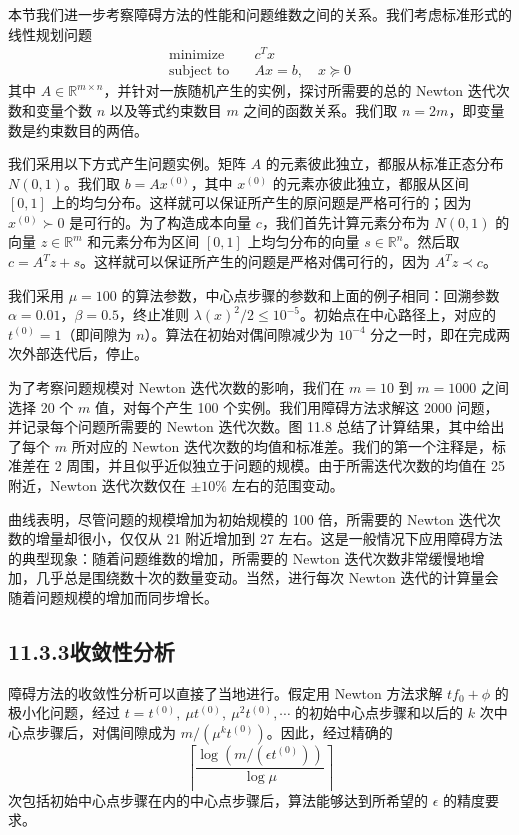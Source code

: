 \documentclass[UTF8,12pt,a4paper,fontset=fandol]{ctexart}
\begin{document}
本节我们进一步考察障碍方法的性能和问题维数之间的关系。我们考虑标准形式的线性规划问题
\[
\begin{aligned}
\text{minimize}\quad & c^Tx\\
\text{subject to}\quad & Ax=b,\quad x\succeq 0
\end{aligned}
\]
其中 $A\in\mathbb{R}^{m\times n}$，并针对一族随机产生的实例，探讨所需要的总的 Newton 迭代次数和变量个数 $n$ 以及等式约束数目 $m$ 之间的函数关系。我们取 $n=2m$，即变量数是约束数目的两倍。

我们采用以下方式产生问题实例。矩阵 $A$ 的元素彼此独立，都服从标准正态分布 $N(0,1)$。我们取 $b=Ax^{(0)}$，其中 $x^{(0)}$ 的元素亦彼此独立，都服从区间 $[0,1]$ 上的均匀分布。这样就可以保证所产生的原问题是严格可行的；因为 $x^{(0)}\succ 0$ 是可行的。为了构造成本向量 $c$，我们首先计算元素分布为 $N(0,1)$ 的向量 $z\in\mathbb{R}^m$ 和元素分布为区间 $[0,1]$ 上均匀分布的向量 $s\in\mathbb{R}^n$。然后取 $c=A^Tz+s$。这样就可以保证所产生的问题是严格对偶可行的，因为 $A^Tz\prec c$。

我们采用 $\mu=100$ 的算法参数，中心点步骤的参数和上面的例子相同：回溯参数 $\alpha=0.01$，$\beta=0.5$，终止准则 $\lambda(x)^2/2\leq 10^{-5}$。初始点在中心路径上，对应的 $t^{(0)}=1$（即间隙为 $n$）。算法在初始对偶间隙减少为 $10^{-4}$ 分之一时，即在完成两次外部迭代后，停止。

为了考察问题规模对 Newton 迭代次数的影响，我们在 $m=10$ 到 $m=1000$ 之间选择 20 个 $m$ 值，对每个产生 100 个实例。我们用障碍方法求解这 2000 问题，并记录每个问题所需要的 Newton 迭代次数。图 11.8 总结了计算结果，其中给出了每个 $m$ 所对应的 Newton 迭代次数的均值和标准差。我们的第一个注释是，标准差在 2 周围，并且似乎近似独立于问题的规模。由于所需迭代次数的均值在 25 附近，Newton 迭代次数仅在 $\pm 10\%$ 左右的范围变动。

曲线表明，尽管问题的规模增加为初始规模的 100 倍，所需要的 Newton 迭代次数的增量却很小，仅仅从 21 附近增加到 27 左右。这是一般情况下应用障碍方法的典型现象：随着问题维数的增加，所需要的 Newton 迭代次数非常缓慢地增加，几乎总是围绕数十次的数量变动。当然，进行每次 Newton 迭代的计算量会随着问题规模的增加而同步增长。

\subsection*{11.3.3\quad 收敛性分析}

障碍方法的收敛性分析可以直接了当地进行。假定用 Newton 方法求解 $tf_0+\phi$ 的极小化问题，经过 $t=t^{(0)},\ \mu t^{(0)},\ \mu^2t^{(0)},\cdots$ 的初始中心点步骤和以后的 $k$ 次中心点步骤后，对偶间隙成为 $m/(\mu^k t^{(0)})$。因此，经过精确的
\begin{equation}
\left\lceil \frac{\log(m/(\epsilon t^{(0)}))}{\log \mu}\right\rceil
\tag{11.13}
\end{equation}
次包括初始中心点步骤在内的中心点步骤后，算法能够达到所希望的 $\epsilon$ 的精度要求。
\end{document}
